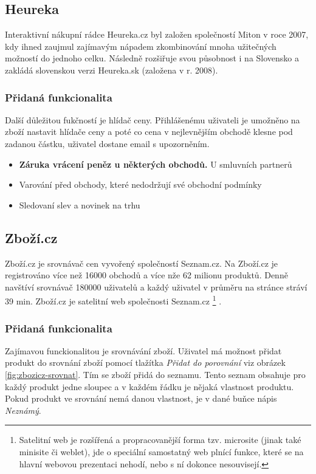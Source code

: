 \subsection{Heureka}
Interaktivní nákupní rádce Heureka.cz byl založen společností Miton v roce 2007, kdy ihned zaujmul zajímavým nápadem zkombinování mnoha užitečných možností do jednoho celku. Následně rozšiřuje svou působnost i na Slovensko a zakládá slovenskou verzi Heureka.sk (založena v r. 2008). \cite{website:wiki:heureka}

\subsubsection{Přidaná funkcionalita}
Další důležitou fukčností je hlídač ceny. Přihlášenému uživateli je umožněno na zboží nastavit hlídače ceny a poté co cena v nejlevnějším obchodě klesne pod zadanou částku, uživatel dostane email s upozorněním.

\begin{itemize}
\item \textbf{Záruka vrácení peněz u některých obchodů.} U smluvních partnerů 
\item Varování před obchody, které nedodržují své obchodní podmínky
\item Sledovaní slev a novinek na trhu
\end{itemize}
\subsection{Zboží.cz}
Zboží.cz je srovnávač cen vyvořený společností Seznam.cz. Na Zboží.cz je registrováno více než 16000 obchodů a více nže 62 milionu produktů. Denně navštíví srovnávač 180000 uživatelů a každý uživatel v průměru na stránce stráví 39 min.\cite{website:zbozi-about}
Zboží.cz je satelitní web společnosti Seznam.cz
\footnote{Satelitní web je rozšířená a propracovanější forma tzv. microsite (jinak také minisite či weblet), jde o speciální samostatný web plnící funkce, které se na hlavní webovou prezentaci nehodí, nebo s ní dokonce nesouvisejí.}
.
\subsubsection{Přidaná funkcionalita}
Zajímavou funckionalitou je srovnávání zboží. Uživatel má možnost přidat produkt do srovnání zboží pomocí tlažítka \emph{Přidat do porovnání} viz obrázek \ref{fig:zbozicz-srovnat}. Tím se zboží přidá do seznamu. Tento seznam obsahuje pro každý produkt jedne sloupec a v každém řádku je nějaká vlastnost produktu. Pokud produkt ve srovnání nemá danou vlastnost, je v dané buňce nápis \emph{Neznámý}.

